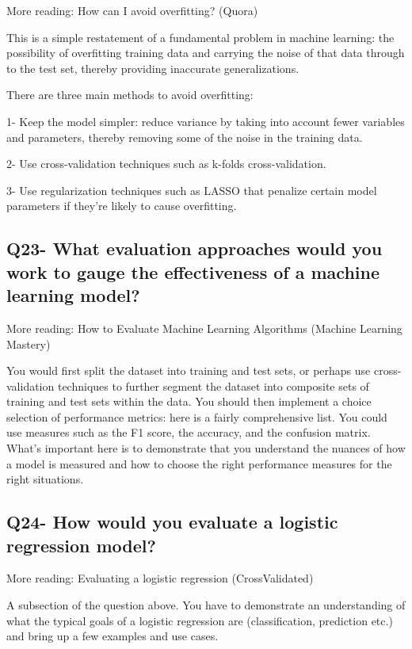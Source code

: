 \documentclass[11pt,a4paper]{article}
\begin{document}
More reading: How can I avoid overfitting? (Quora)

This is a simple restatement of a fundamental problem in machine learning: the possibility of overfitting training data and carrying the noise of that data through to the test set, thereby providing inaccurate generalizations.

There are three main methods to avoid overfitting:

1- Keep the model simpler: reduce variance by taking into account fewer variables and parameters, thereby removing some of the noise in the training data.

2- Use cross-validation techniques such as k-folds cross-validation.

3- Use regularization techniques such as LASSO that penalize certain model parameters if they’re likely to cause overfitting.


\subsection{Q23- What evaluation approaches would you work to gauge the effectiveness of a machine learning model?}

More reading: How to Evaluate Machine Learning Algorithms (Machine Learning Mastery)

You would first split the dataset into training and test sets, or perhaps use cross-validation techniques to further segment the dataset into composite sets of training and test sets within the data. You should then implement a choice selection of performance metrics: here is a fairly comprehensive list. You could use measures such as the F1 score, the accuracy, and the confusion matrix. What’s important here is to demonstrate that you understand the nuances of how a model is measured and how to choose the right performance measures for the right situations.

\subsection{Q24- How would you evaluate a logistic regression model?}

More reading: Evaluating a logistic regression (CrossValidated)

A subsection of the question above. You have to demonstrate an understanding of what the typical goals of a logistic regression are (classification, prediction etc.) and bring up a few examples and use cases.
\end{document}
